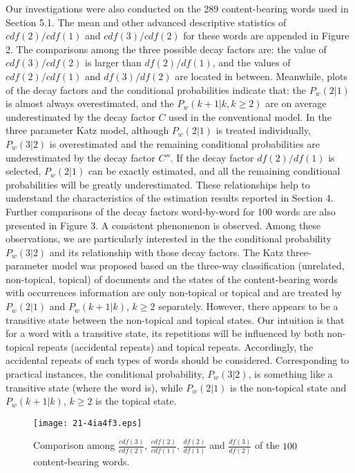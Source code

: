 \documentclass[english]{jnlp_1.4_rep}
\begin{document}
Our investigations were also conducted on the 289 content-bearing words used in Section 5.1. The mean and other advanced descriptive statistics of
$\mathit{cdf}(2) / \mathit{cdf}(1)$ and $\mathit{cdf}(3) / \mathit{cdf}(2)$ for these words are appended in Figure 2. The comparisons among the
three possible decay factors are: the value of $\mathit{cdf}(3) / \mathit{cdf}(2)$ is larger than $\mathit{df}(2) / \mathit{df}(1)$, and the values
of $\mathit{cdf}(2) / \mathit{cdf}(1)$ and $\mathit{df}(3) / \mathit{df}(2)$ are located in between. Meanwhile, plots of the decay factors and the
conditional probabilities indicate that: the $P_{w}(2|1)$ is almost always overestimated, and the $P_{w}(k+1|k,k\ge 2)$ are on average
underestimated by the decay factor $C$ used in the conventional model. In the three parameter Katz model, although $P_{w}(2|1)$ is treated
individually, $P_{w}(3|2)$ is overestimated and the remaining conditional probabilities are underestimated by the decay factor $C''$. If the decay
factor $\mathit{df}(2) / \mathit{df}(1)$ is selected, $P_{w}(2|1)$ can be exactly estimated, and all the remaining conditional probabilities will be
greatly underestimated. These relationships help to understand the characteristics of the estimation results reported in Section 4. Further
comparisons of the decay factors word-by-word for 100 words are also presented in Figure 3. A consistent phenomenon is observed. Among these
observations, we are particularly interested in the the conditional probability $P_{w}(3|2)$ and its relationship with those decay factors. The Katz
three-parameter model was proposed based on the three-way classification (unrelated, non-topical, topical) of documents and the states of the
content-bearing words with occurrences information are only non-topical or topical and are treated by $P_{w}(2|1)$ and $P_{w}(k+1|k)$, $k\ge 2$
separately. However, there appears to be a transitive state between the non-topical and topical states. Our intuition is that for a word with a
transitive state, its repetitions will be influenced by both non-topical repeats (accidental repeats) and topical repeats. Accordingly, the
accidental repeats of such types of words should be considered. Corresponding to practical instances, the conditional probability, $P_{w}(3|2)$, is
something like a transitive state (where the word is), while $P_{w}(2|1)$ is the non-topical state and $P_{w}(k+1|k)$, $k\ge 2$ is the topical state.

\begin{figure}[t]
\begin{center}
\texttt{[image: 21-4ia4f3.eps]}
\end{center}
\caption{Comparison among $\frac{\mathit{cdf}(3)}{\mathit{cdf}(2)}$, $\frac{\mathit{cdf}(2)}{\mathit{cdf}(1)}$, $\frac{\mathit{df}(2)}{\mathit{df}(1)}$ and $\frac{\mathit{df}(3)}{\mathit{df}(2)}$ of the $100$ content-bearing words.}
\label{the comparison of parameters}
\end{figure}
\end{document}
